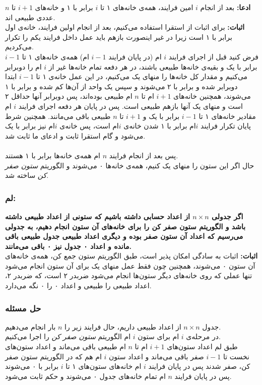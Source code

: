 \documentclass[12pt,a4paper]{article}
\begin{document}
\textbf{ادعا:}
بعد از انجام $i$ امین فرایند، همه‌ی خانه‌های ۱ تا $i$ برابر با ۱ و خانه‌های $i+1$ تا $n$ عددی طبیعی اند.
\\
\textbf{اثبات:}
برای اثبات از استقرا استفاده می‌کنیم، بعد از انجام اولین فرایند، خانه‌ی اول برابر با ۱ است زیرا در غیر اینصورت بازهم باید عمل داخل فرایند یکم را تکرار می‌کردیم.
\\
فرض کنید قبل از اجرای فرایند $i$ ام (در پایان فرایند $i-1$ ام) همه‌ی خانه‌های ۱ تا $i-1$ برابر با یک و بقیه‌ی خانه‌ها طبیعی باشند، در هر دفعه تمام خانه‌ها غیر از $i$ ام را دوبرابر می‌کنیم و مقدار کل خانه‌ها را منهای یک می‌کنیم، در این عمل خانه‌ی ۱ تا $i-1$ ابتدا دوبرابر شده و برابر با ۲ می‌شوند و سپس یک واحد از آن‌ها کم شده و برابر با ۱ می‌شوند، همچنین خانه‌های $i+1$ ام تا $n$ ام طبیعی بوده‌اند، پس دوبرابر آنها حداقل ۲ است و منهای یک آنها بازهم طبیعی است. پس در پایان هر دفعه اجرای فرایند $i$ ام مقادیر خانه‌های ۱ تا $i-1$ برابر با یک و $i+1$ تا $n$ طبیعی باقی می‌مانند. همچنین شرط پایان تکرار فرایند $i$ام برابر با ۱ شدن خانه‌ی $i$ام است، پس خانه‌ی $i$ام نیز برابر با یک می‌شود و گام استقرا ثابت و ادعای ما ثابت شد.
\\
\\
پس بعد از انجام فرایند $n$ ام همه‌ی خانه‌ها برابر با ۱ هستند.
\\
حال اگر این ستون را منهای یک کنیم، همه‌ی خانه‌ها ۰ می‌شوند و الگوریتم \textit{ستون صفر کن} ساخته شد.
\subsubsection*{لم:}
\textbf{
	اگر جدولی $n\times n$ از اعداد حسابی داشته باشیم که ستونی از اعداد طبیعی داشته باشد و الگوریتم ستون صفر کن را برای خانه‌های آن ستون انجام دهیم، به جدولی می‌رسیم که اعداد آن ستون صفر بوده و دیگری اعداد طبیعی جدول طبیعی باقی مانده و اعداد ۰ جدول نیز ۰ باقی می‌مانند.
}
\\
\textbf{اثبات:}
اثبات به سادگی امکان پذیر است، طبق الگوریتم ستون جمع کن، همه‌ی خانه‌های آن ستون ۰ می‌شوند، همچنین چون فقط عمل منهای یک برای آن ستون انجام می‌شود تنها عملی که روی خانه‌های دیگر ستون‌ها انجام می‌شود ضربدر ۲ است، که ضربدر ۲، اعداد طبیعی را طبیعی و اعداد ۰ را ۰ نگه می‌دارد.
\\
\subsubsection*{حل مسئله}
جدول 
$n \times n$
از اعداد طبیعی داریم، حال فرایند زیر را $n$ بار انجام می‌دهیم.
\\
در مرحله‌ی $i$ ام برای ستون $i$ ام الگوریتم \textit{ستون صفر کن} را اجرا می‌کنیم.
\\
طبق لم اعداد ستون‌های $i+1$ ام تا $n$ ام طبیعی باقی می‌ماند و اعداد ستون‌های نخست تا $i-1$ صفر باقی می‌ماند و اعداد ستون $i$ ام هم که در الگوریتم ستون صفر کن، صفر شدند پس در پایان فرایند $i$ ام خانه‌های ستون‌های ۱ تا $i$ برابر با ۰ می‌شوند پس در پایان فرایند $n$ ام تمام خانه‌های جدول ۰ می‌شوند و حکم ثابت می‌شود.
\end{document}
